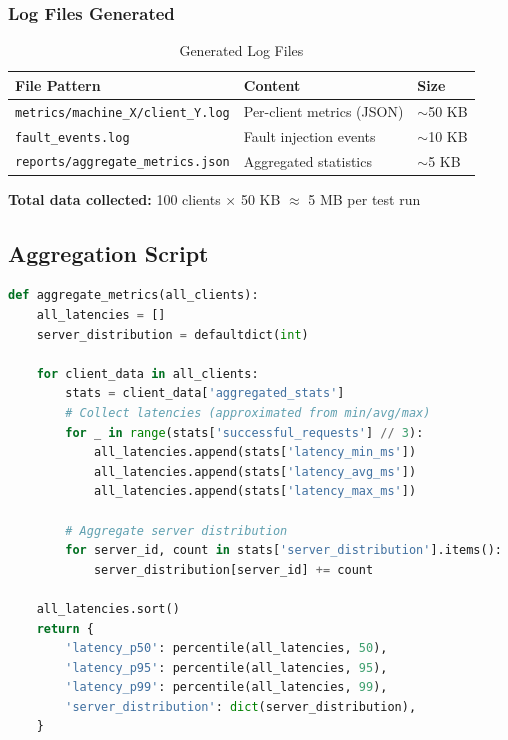 \documentclass[12pt,a4paper]{article}
\begin{document}
\subsubsection{Log Files Generated}

\begin{table}[h]
\centering
\caption{Generated Log Files}
\label{tab:logs}
\begin{tabular}{@{}lll@{}}
\toprule
\textbf{File Pattern} & \textbf{Content} & \textbf{Size} \\
\midrule
\texttt{metrics/machine\_X/client\_Y.log} & Per-client metrics (JSON) & $\sim$50 KB \\
\texttt{fault\_events.log} & Fault injection events & $\sim$10 KB \\
\texttt{reports/aggregate\_metrics.json} & Aggregated statistics & $\sim$5 KB \\
\bottomrule
\end{tabular}
\end{table}

\textbf{Total data collected:} 100 clients $\times$ 50 KB $\approx$ 5 MB per test run

\subsection{Aggregation Script}

\begin{lstlisting}[language=Python,caption={Metrics Aggregation (Simplified)},label=lst:aggregation]
def aggregate_metrics(all_clients):
    all_latencies = []
    server_distribution = defaultdict(int)

    for client_data in all_clients:
        stats = client_data['aggregated_stats']
        # Collect latencies (approximated from min/avg/max)
        for _ in range(stats['successful_requests'] // 3):
            all_latencies.append(stats['latency_min_ms'])
            all_latencies.append(stats['latency_avg_ms'])
            all_latencies.append(stats['latency_max_ms'])

        # Aggregate server distribution
        for server_id, count in stats['server_distribution'].items():
            server_distribution[server_id] += count

    all_latencies.sort()
    return {
        'latency_p50': percentile(all_latencies, 50),
        'latency_p95': percentile(all_latencies, 95),
        'latency_p99': percentile(all_latencies, 99),
        'server_distribution': dict(server_distribution),
    }
\end{lstlisting}
\end{document}
